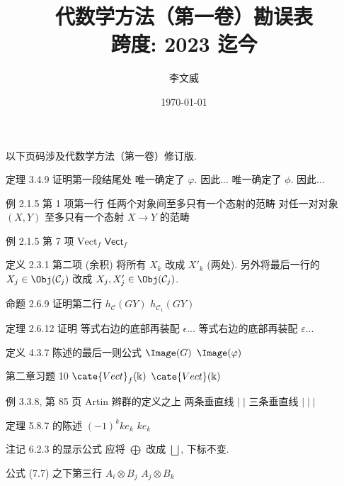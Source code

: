 \documentclass{AJerrata}
\title{\bfseries 代数学方法（第一卷）勘误表 \\ 跨度: 2023 迄今 }
\author{李文威}
\date{\today}
\begin{document}
	\maketitle
	以下页码涉及代数学方法（第一卷）修订版.

	\begin{Errata}
		\item[定理 3.4.9 证明第一段结尾处]
		\Orig 唯一确定了 $\varphi$. 因此...
		\Corr 唯一确定了 $\phi$. 因此...
		
		\item[例 2.1.5 第 1 项第一行]
		\Orig 任两个对象间至多只有一个态射的范畴
		\Corr 对任一对对象 $(X, Y)$ 至多只有一个态射 $X \to Y$ 的范畴
		
		\item[例 2.1.5 第 7 项]
		\Orig $\mathrm{Vect}_f$
		\Corr $\mathsf{Vect}_f$
		
		\item[定义 2.3.1 第二项 (余积)]
		将所有 $X_k$ 改成 $X'_k$ (两处). 另外将最后一行的 $X_j \in \Obj(\mathcal{C}_j)$ 改成 $X_j, X'_j \in \Obj(\mathcal{C}_j)$.
		
		\item[命题 2.6.9 证明第二行]
		\Orig $h_{\mathcal{C}}(GY)$
		\Corr $h_{\mathcal{C}_1}(GY)$
		
		\item[定理 2.6.12 证明]
		\Orig 等式右边的底部再装配 $\epsilon$...
		\Corr 等式右边的底部再装配 $\varepsilon$...
		
		\item[定义 4.3.7 陈述的最后一则公式]
		\Orig $\Image(G)$
		\Corr $\Image(\varphi)$
		
		\item[第二章习题 10]
		\Orig $\cate{Vect}_f(\Bbbk)$
		\Corr $\cate{Vect}(\Bbbk)$
		
		\item[例 3.3.8, 第 85 页 Artin 辫群的定义之上]
		\Orig 两条垂直线 $\vert\;\vert$
		\Corr 三条垂直线 $\vert\;\vert\;\vert$
		
		\item[定理 5.8.7 的陈述]
		\Orig $(-1)^k k e_k$
		\Corr $k e_k$
		
		\item[注记 6.2.3 的显示公式]
		应将 $\bigoplus$ 改成 $\bigsqcup$, 下标不变.

		\item[公式 (7.7) 之下第三行]
		\Orig $A_i \otimes B_j$
		\Corr $A_j \otimes B_k$
		

\end{Errata}
\end{document}

